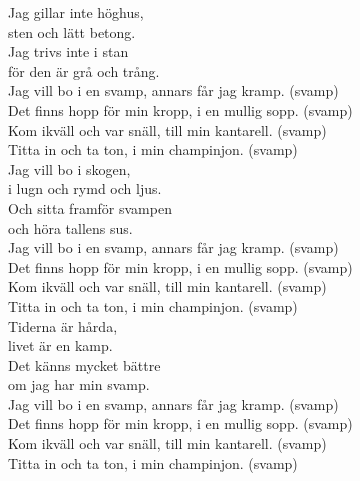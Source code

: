 \documentclass[a6paper,10pt]{article}
\begin{document}
\setlength{\oddsidemargin}{-0.37in}
\begin{center}
\end{center}
\begin{lyrics}
\small Jag gillar inte höghus,\\
sten och lätt betong.\\
Jag trivs inte i stan\\
för den är grå och trång.
\vspace{5pt}\\
Jag vill bo i en svamp, annars får jag kramp. (svamp)\\
Det finns hopp för min kropp, i en mullig sopp. (svamp)\\
Kom ikväll och var snäll, till min kantarell. (svamp)\\
Titta in och ta ton, i min champinjon. (svamp)
\vspace{5pt}\\
Jag vill bo i skogen,\\
i lugn och rymd och ljus.\\
Och sitta framför svampen\\
och höra tallens sus.
\vspace{5pt}\\
Jag vill bo i en svamp, annars får jag kramp. (svamp)\\
Det finns hopp för min kropp, i en mullig sopp. (svamp)\\
Kom ikväll och var snäll, till min kantarell. (svamp)\\
Titta in och ta ton, i min champinjon. (svamp)
\vspace{5pt}\\
Tiderna är hårda,\\
livet är en kamp.\\
Det känns mycket bättre\\
om jag har min svamp.
\vspace{5pt}\\
Jag vill bo i en svamp, annars får jag kramp. (svamp)\\
Det finns hopp för min kropp, i en mullig sopp. (svamp)\\
Kom ikväll och var snäll, till min kantarell. (svamp)\\
Titta in och ta ton, i min champinjon. (svamp)
\vspace{5pt}\\
\end{lyrics}
\end{document}
